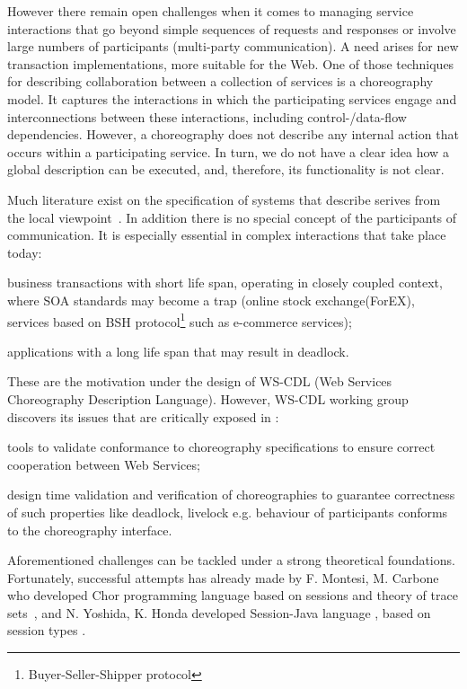 \documentclass{llncs}
\begin{document}
However there remain open challenges when it comes to managing service interactions that go beyond simple sequences of requests and responses or involve large numbers of participants (multi-party communication). A need arises for new transaction implementations, more suitable for the Web. One of those techniques for describing collaboration between a collection of services is a choreography model. It captures the interactions in which the participating services engage and interconnections between these interactions, including control-/data-flow dependencies. However, a choreography does not describe any internal action that occurs within a participating service. In turn, we do not have a clear idea how a global description can be executed, and, therefore, its functionality is not clear.

Much literature exist on the specification of systems that describe serives from the local viewpoint~\cite{cs-processes,alg-seq-processes}. In addition there is no special concept of the participants of communication. It is especially essential in complex interactions that take place today: 

	\begin{compactenum}
	   \item business transactions with short life span, operating in closely coupled context, where SOA standards may become a trap (online stock exchange(ForEX), services based on BSH protocol\footnote{Buyer-Seller-Shipper protocol} such as e-commerce services);
	   \item applications with a long life span that may result in deadlock.
	\end{compactenum}
These are the motivation under the design of WS-CDL (Web Services Choreography Description Language). However, WS-CDL working group discovers its issues that are critically exposed in \cite{ws-critical-overview}:
\begin{compactenum}
	\item tools to validate conformance to choreography specifications to ensure correct cooperation between Web Services;
	\item design time validation and verification of choreographies to guarantee correctness of such properties like deadlock, livelock e.g. behaviour of participants conforms to the choreography interface.
\end{compactenum}
Aforementioned challenges can be tackled under a strong theoretical foundations. Fortunately, successful attempts has already made by F. Montesi, M. Carbone who developed Chor programming language \cite{chor-lang,carbone2013deadlock} based on sessions and theory of trace sets~\cite{chor-essence}, and N. Yoshida, K. Honda developed Session-Java language \cite{sj-lang}, based on session types \cite{session-types-sessions,carbone2007structured}.
\end{document}
